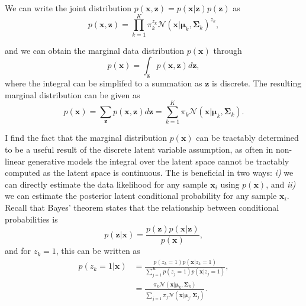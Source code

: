 \documentclass{article}
\begin{document}
We can write the joint distribution $p(\mathbf{x}, \mathbf{z}) = p(\mathbf{x}\vert\mathbf{z})p(\mathbf{z})$ as 
\begin{equation}\label{eq:joint_distribution}
p(\mathbf{x}, \mathbf{z}) = \prod_{k=1}^{K} \pi_k^{z_k} \mathcal{N}(\mathbf{x}\vert \boldsymbol\mu_k, \boldsymbol\Sigma_k)^{z_k},
\end{equation}

and we can obtain the marginal data distribution $p(\mathbf{x})$ through
\begin{equation}
p(\mathbf{x}) = \int_{\mathbf{z}}p(\mathbf{x}, \mathbf{z})d\mathbf{z},
\end{equation}
where the integral can be simplifed to a summation as $\mathbf{z}$ is discrete. The resulting marginal distribution can be given as
\begin{equation}
p(\mathbf{x}) = \sum_{\mathbf{z}}p(\mathbf{x}, \mathbf{z})d\mathbf{z} = \sum_{k=1}^{K} \pi_k \mathcal{N}(\mathbf{x}\vert \boldsymbol\mu_k, \boldsymbol\Sigma_k).
\end{equation}

I find the fact that the marginal distribution $p(\mathbf{x})$ can be tractably determined to be a useful result of the discrete latent variable assumption, as often in non-linear generative models the integral over the latent space cannot be tractably computed as the latent space is continuous. The is beneficial in two ways: \emph{i)} we can directly estimate the data likelihood for any sample $\mathbf{x}_i$ using $p(\mathbf{x})$, and \emph{ii)} we can estimate the posterior latent conditional probability for any sample $\mathbf{x}_i$. Recall that Bayes' theorem states that the relationship between conditional probabilities is
\begin{equation}
p(\mathbf{z} \vert \mathbf{x}) = \frac{p(\mathbf{z})p(\mathbf{x}\vert \mathbf{z})}{p(\mathbf{x})},
\end{equation}
and for $z_k = 1$, this can be written as
\begin{equation}
\begin{aligned}
p(z_k = 1 \vert \mathbf{x}) &= \frac{p(z_k = 1)p(\mathbf{x}\vert z_k = 1)}{\sum_{j=1}^{K}p(z_j = 1)p(\mathbf{x}\vert z_j = 1)}, \\
&= \frac{\pi_k\mathcal{N}(\mathbf{x}\vert \boldsymbol\mu_k, \boldsymbol\Sigma_k)}{\sum_{j=1}\pi_j\mathcal{N}(\mathbf{x}\vert \boldsymbol\mu_j, \boldsymbol\Sigma_j)}. \\
\end{aligned}
\end{equation}
\end{document}

